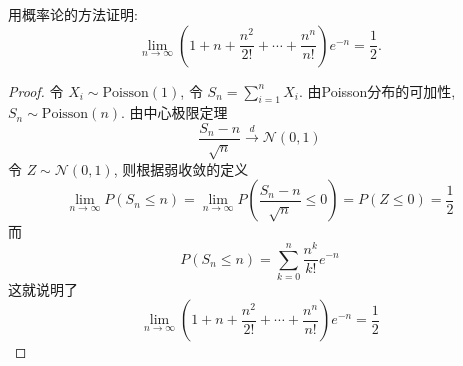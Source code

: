 \documentclass[../main.tex]{subfiles}
\begin{document}
\begin{exercise}{}{}
用概率论的方法证明:
$$
\lim_{n\to\infty}\left(1+n+\frac{n^2}{2!}+\cdots+\frac{n^n}{n!}\right)e^{-n}=\frac{1}{2}.
$$
\end{exercise}
\begin{proof}
令 $X_{i}\sim \mathrm{Poisson}\left(1\right)$, 令 $S_{n}= \sum _{i= 1}^{n}X_{i}$. 由Poisson分布的可加性, $S_{n}\sim \mathrm{Poisson}\left(n\right)$. 由中心极限定理
 $$ \frac{S_{n}-n }{\sqrt{n} }\xrightarrow{d} \mathcal{N}\left(0,1\right)  $$
令 $Z\sim \mathcal{N}\left(0,1\right)$, 则根据弱收敛的定义
 $$ \lim_{n\to \infty}P\left(S_{n}\le n\right)= \lim_{n\to \infty}P\left(\frac{S_{n}-n }{\sqrt{n} }\le 0\right)= P\left(Z\le 0\right)= \frac{1}{2} $$
而
 $$ P\left(S_{n}\le n\right)= \sum _{k= 0}^{n}\frac{n^{k} }{k! }e^{-n} $$
这就说明了
 $$ \lim_{n\to \infty}\left(1+ n+ \frac{n^{2} }{2! }+ \cdots + \frac{n^{n} }{n! }\right)e^{-n}= \frac{1}{2} $$
\end{proof}
\end{document}
